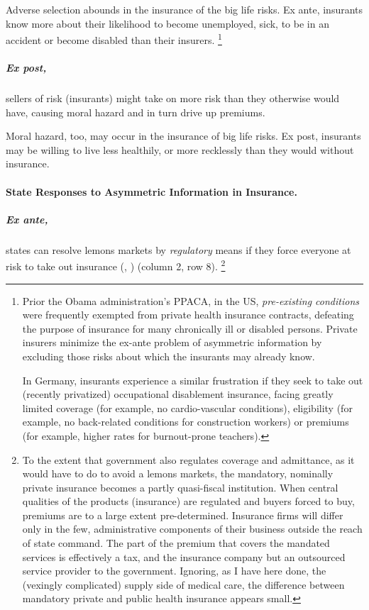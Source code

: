 Adverse selection abounds in the insurance of the big life risks.
Ex ante, insurants know more about their likelihood to become unemployed, sick, to be in an accident or become disabled than their insurers.
\footnote{
	Prior the Obama administration's \gls{PPACA}, in the US, \emph{pre-existing conditions} were frequently exempted from private health insurance contracts, defeating the purpose of insurance for many chronically ill or disabled persons.
	Private insurers minimize the ex-ante problem of asymmetric information by excluding those risks about which the insurants may already know.

	In Germany, insurants experience a similar frustration if they seek to take out (recently privatized) occupational disablement insurance, facing greatly limited coverage (for example, no cardio-vascular conditions), eligibility (for example, no back-related conditions for construction workers) or premiums (for example, higher rates for burnout-prone teachers).
}

\subparagraph[Moral Hazard]{Ex post,}  \label{sec:moral-hazard} sellers of risk (insurants) might take on more risk than they otherwise would have, causing moral hazard and in turn drive up premiums.

Moral hazard, too, may occur in the insurance of big life risks.
Ex post, insurants may be willing to live less healthily, or more recklessly than they would without insurance.

\paragraph{State Responses to Asymmetric Information in Insurance.}  \label{sec:state-insurance}

\subparagraph{Ex ante,} states can resolve lemons markets by \emph{regulatory} means if they force everyone at risk to take out insurance (\citealt{Akerlof-1970-aa}, \citealt{Barr})
(column 2, row 8).
\footnote{
	To the extent that government also regulates coverage and admittance, as it would have to do to avoid a lemons markets, the mandatory, nominally private insurance becomes a partly quasi-fiscal institution.
	When central qualities of the products (insurance) are regulated and buyers forced to buy, premiums are to a large extent pre-determined.
	Insurance firms will differ only in the few, administrative components of their business outside the reach of state command.
	The part of the premium that covers the mandated services is effectively a tax, and the insurance company but an outsourced service provider to the government.
	Ignoring, as I have here done, the (vexingly complicated) supply side of medical care, the difference between mandatory private and public health insurance appears small.
}

